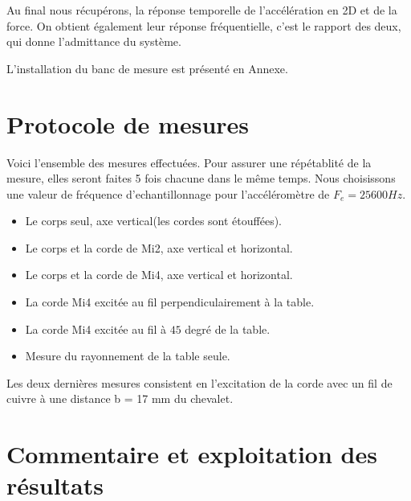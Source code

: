 Au final nous récupérons, la réponse temporelle de l'accélération en 2D et de la force. On obtient également leur réponse fréquentielle, c'est le rapport des deux, qui donne l'admittance du système.

L'installation du banc de mesure est présenté en Annexe. %


\section{Protocole de mesures}
Voici l'ensemble des mesures effectuées. Pour assurer une répétablité de la mesure, elles seront faites 5 fois chacune dans le même temps. Nous choisissons une valeur de fréquence d'echantillonnage pour l'accéléromètre de  $F_e = 25600Hz$.
\begin{itemize}
\item Le corps seul, axe vertical(les cordes sont étouffées).
\item Le corps et la corde de Mi2, axe vertical et horizontal.
\item Le corps et la corde de Mi4, axe vertical et horizontal.
\item La corde Mi4 excitée au fil perpendiculairement à la table.
\item La corde Mi4 excitée au fil à $45$ degré de la table.
\item Mesure du rayonnement de la table seule.
\end{itemize}
Les deux dernières mesures consistent en l'excitation de la corde avec un fil de cuivre à une distance b = 17 mm du chevalet. 

\section{Commentaire et exploitation des résultats}
